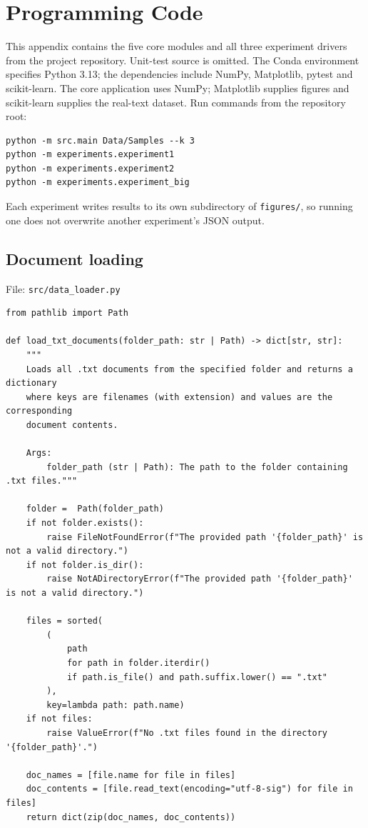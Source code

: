 \documentclass[12pt,a4paper]{report}
\theoremstyle{plain}
\theoremstyle{definition}
\theoremstyle{remark}
\theoremstyle{definition}
\begin{document}
\appendix
\chapter{Programming Code}
This appendix contains the five core modules and all three experiment drivers from the project repository. Unit-test source is omitted. The Conda environment specifies Python 3.13; the dependencies include NumPy, Matplotlib, pytest and scikit-learn. The core application uses NumPy; Matplotlib supplies figures and scikit-learn supplies the real-text dataset. Run commands from the repository root:
\begin{verbatim}
python -m src.main Data/Samples --k 3
python -m experiments.experiment1
python -m experiments.experiment2
python -m experiments.experiment_big
\end{verbatim}
Each experiment writes results to its own subdirectory of \texttt{figures/}, so running one does not overwrite another experiment's JSON output.

\section{Document loading}
\noindent File: \texttt{src/data\_loader.py}
\begin{lstlisting}
from pathlib import Path

def load_txt_documents(folder_path: str | Path) -> dict[str, str]:
    """
    Loads all .txt documents from the specified folder and returns a dictionary
    where keys are filenames (with extension) and values are the corresponding
    document contents.

    Args:
        folder_path (str | Path): The path to the folder containing .txt files."""

    folder =  Path(folder_path)
    if not folder.exists():
        raise FileNotFoundError(f"The provided path '{folder_path}' is not a valid directory.")
    if not folder.is_dir():
        raise NotADirectoryError(f"The provided path '{folder_path}' is not a valid directory.")

    files = sorted(
        (
            path
            for path in folder.iterdir()
            if path.is_file() and path.suffix.lower() == ".txt"
        ),
        key=lambda path: path.name)
    if not files:
        raise ValueError(f"No .txt files found in the directory '{folder_path}'.")

    doc_names = [file.name for file in files]
    doc_contents = [file.read_text(encoding="utf-8-sig") for file in files]
    return dict(zip(doc_names, doc_contents))
\end{lstlisting}
\end{document}
